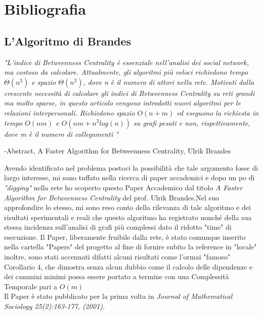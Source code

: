 \chapter{Bibliografia}
\section{L'Algoritmo di Brandes}
	\emph{"L'indice di Betweenness Centrality  è essenziale nell'analisi dei social network, ma costoso da calcolare. Attualmente, gli algoritmi più veloci richiedono tempo $\Theta(n^3)$ e spazio $\Theta(n^2)$, dove n è il numero di attori nella rete. Motivati dalla crescente necessità di calcolare gli indici di Betweenness Centrality su reti grandi ma molto sparse, in questo articolo vengono introdotti nuovi algoritmi per le relazioni interpersonali. Richiedono spazio $O(n + m)$ ed eseguono la richiesta in tempo $O(nm)$ e $O(nm + n^2log(n))$ su grafi pesati e non, rispettivamente, dove m è il numero di collegamenti "}\\ 
\begin{flushright}
 -Abstract, A Faster Algorithm for Betweenness Centrality, Ulrik Brandes\\
\end{flushright}

\noindent Avendo identificato nel problema postoci la possibilità che tale argomento fosse di largo interesse, mi sono tuffato nella ricerca di paper accademici e dopo un po di \emph{"digging"} nella rete ho scoperto questo Paper Accademico dal titolo \emph{A Faster Algorithm for Betweenness Centrality} del prof. Ulrik Brandes.Nel suo approfondire lo stesso, mi sono reso conto della rilevanza di tale algoritmo e dei risultati sperimentali e reali che questo algoritmo ha registrato nonché della sua stessa incidenza sull'analisi di grafi più complessi dato il ridotto "time" di esecuzione.
Il Paper, liberamente fruibile dalla rete, è stato comunque inserito nella cartella "Papers" del progetto al fine di fornire subito la reference in "locale" inoltre, sono stati accennati difatti alcuni risultati come l'ormai "famoso" Corollario 4, che dimostra senza alcun dubbio come il calcolo delle dipendenze e dei cammini minimi possa essere portato a termine con una Complessità Temporale pari a $O(m)$
\\Il Paper è stato pubblicato per la prima volta in \emph{Journal of Mathematical Sociology 25(2):163-177, (2001).}